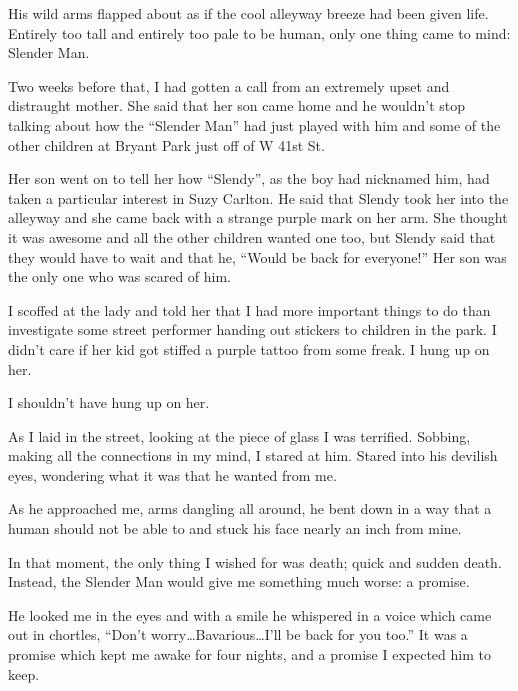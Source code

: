 His wild arms flapped about as if the cool alleyway breeze had been
given life. Entirely too tall and entirely too pale to be human,
only one thing came to mind: Slender Man.



Two weeks before that, I had gotten a call from an extremely upset
and distraught mother. She said that her son came home and he
wouldn't stop talking about how the ``Slender Man''
had just played with him and some of the other children at Bryant
Park just off of W 41st St.



Her son went on to tell her how ``Slendy'', as the boy
had nicknamed him, had taken a particular interest in Suzy Carlton.
He said that Slendy took her into the alleyway and she came back
with a strange purple mark on her arm. She thought it was awesome
and all the other children wanted one too, but Slendy said that
they would have to wait and that he, ``Would be back for
everyone!'' Her son was the only one who was scared of
him.



I scoffed at the lady and told her that I had more important things
to do than investigate some street performer handing out stickers
to children in the park. I didn't care if her kid got stiffed
a purple tattoo from some freak. I hung up on her.



I shouldn't have hung up on her.



As I laid in the street, looking at the piece of glass I was
terrified. Sobbing, making all the connections in my mind, I stared
at him. Stared into his devilish eyes, wondering what it was that
he wanted from me.



As he approached me, arms dangling all around, he bent down in a
way that a human should not be able to and stuck his face nearly an
inch from mine.



In that moment, the only thing I wished for was death; quick and
sudden death. Instead, the Slender Man would give me something much
worse: a promise.



He looked me in the eyes and with a smile he whispered in a voice
which came out in chortles, ``Don't
worry{\ldots}Bavarious{\ldots}I'll be back for you
too.'' It was a promise which kept me awake for four nights,
and a promise I expected him to keep.



